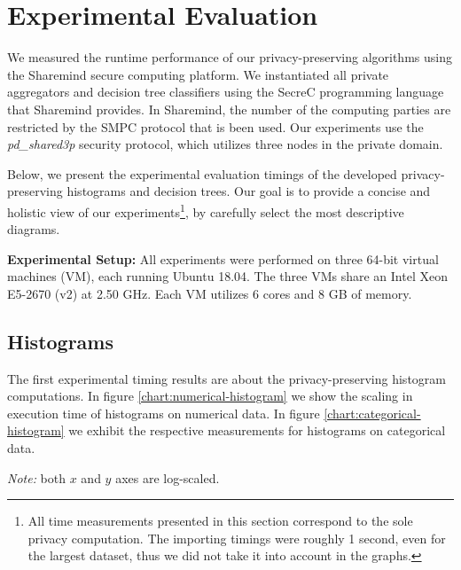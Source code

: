 \chapter{Experimental Evaluation}\label{c:evaluations}



We measured the runtime performance of our privacy\hyp preserving algorithms using the Sharemind secure computing platform.
We instantiated all private aggregators and decision tree classifiers using the SecreC programming language \cite{jagomagis2010secrec} that Sharemind provides.
In Sharemind, the number of the computing parties are restricted by the SMPC protocol that is been used.
Our experiments use the \textit{pd\_shared3p} security protocol, which utilizes three nodes in the private domain.


Below, we present the experimental evaluation timings of the developed privacy\hyp preserving histograms and decision trees.
Our goal is to provide a concise and holistic view of our experiments\footnote{All time measurements presented in this section correspond to the sole privacy computation. The importing timings were roughly 1 second, even for the largest dataset, thus we did not take it into account in the graphs.}, by carefully select the most descriptive diagrams.


\textbf{Experimental Setup:}
All experiments were performed on three 64-bit virtual machines (VM), each running Ubuntu 18.04.
The three VMs share an Intel Xeon E5-2670 (v2) at 2.50 GHz.
Each VM utilizes 6 cores and 8 GB of memory.


\section{Histograms}\label{s:results-histograms}

The first experimental timing results are about the privacy\hyp preserving histogram computations.
In figure \ref{chart:numerical-histogram} we show the scaling in execution time of histograms on numerical data.
In figure \ref{chart:categorical-histogram} we exhibit the respective measurements for histograms on categorical data.

\textit{Note:} both $x$ and $y$ axes are log\hyp scaled.


